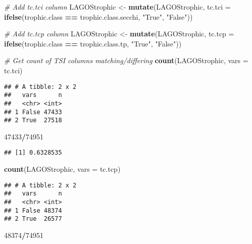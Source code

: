 \documentclass[]{article}
\newenvironment{Shaded}{\begin{snugshade}}{\end{snugshade}}
\newcommand{\CommentTok}[1]{\textcolor[rgb]{0.56,0.35,0.01}{\textit{#1}}}
\newcommand{\DataTypeTok}[1]{\textcolor[rgb]{0.13,0.29,0.53}{#1}}
\newcommand{\DecValTok}[1]{\textcolor[rgb]{0.00,0.00,0.81}{#1}}
\newcommand{\KeywordTok}[1]{\textcolor[rgb]{0.13,0.29,0.53}{\textbf{#1}}}
\newcommand{\NormalTok}[1]{#1}
\newcommand{\OperatorTok}[1]{\textcolor[rgb]{0.81,0.36,0.00}{\textbf{#1}}}
\newcommand{\StringTok}[1]{\textcolor[rgb]{0.31,0.60,0.02}{#1}}
\begin{document}
\begin{Shaded}
\begin{Highlighting}[]
\CommentTok{# Add tc.tci column}
\NormalTok{LAGOStrophic <-}\StringTok{ }
\StringTok{  }\KeywordTok{mutate}\NormalTok{(LAGOStrophic, }\DataTypeTok{tc.tci =} 
           \KeywordTok{ifelse}\NormalTok{(trophic.class }\OperatorTok{==}\StringTok{ }\NormalTok{trophic.class.secchi,}
                  \StringTok{"True"}\NormalTok{, }\StringTok{"False"}\NormalTok{))}

\CommentTok{# Add tc.tcp column}
\NormalTok{LAGOStrophic <-}\StringTok{ }
\StringTok{  }\KeywordTok{mutate}\NormalTok{(LAGOStrophic, }\DataTypeTok{tc.tcp =} 
           \KeywordTok{ifelse}\NormalTok{(trophic.class }\OperatorTok{==}\StringTok{ }\NormalTok{trophic.class.tp,}
                  \StringTok{"True"}\NormalTok{, }\StringTok{"False"}\NormalTok{))}

\CommentTok{# Get count of TSI columns matching/differing}
\KeywordTok{count}\NormalTok{(LAGOStrophic, }\DataTypeTok{vars =}\NormalTok{ tc.tci)}
\end{Highlighting}
\end{Shaded}

\begin{verbatim}
## # A tibble: 2 x 2
##   vars      n
##   <chr> <int>
## 1 False 47433
## 2 True  27518
\end{verbatim}

\begin{Shaded}
\begin{Highlighting}[]
\DecValTok{47433}\OperatorTok{/}\DecValTok{74951}
\end{Highlighting}
\end{Shaded}

\begin{verbatim}
## [1] 0.6328535
\end{verbatim}

\begin{Shaded}
\begin{Highlighting}[]
\KeywordTok{count}\NormalTok{(LAGOStrophic, }\DataTypeTok{vars =}\NormalTok{ tc.tcp)}
\end{Highlighting}
\end{Shaded}

\begin{verbatim}
## # A tibble: 2 x 2
##   vars      n
##   <chr> <int>
## 1 False 48374
## 2 True  26577
\end{verbatim}

\begin{Shaded}
\begin{Highlighting}[]
\DecValTok{48374}\OperatorTok{/}\DecValTok{74951}
\end{Highlighting}
\end{Shaded}
\end{document}
